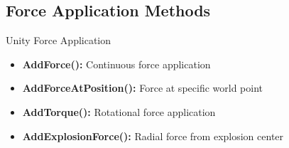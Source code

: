 \subsection{Force Application Methods}

\begin{definition}{Unity Force Application}
    \begin{itemize}
        \item \textbf{AddForce():} Continuous force application
        \item \textbf{AddForceAtPosition():} Force at specific world point
        \item \textbf{AddTorque():} Rotational force application
        \item \textbf{AddExplosionForce():} Radial force from explosion center
    \end{itemize}
\end{definition}


